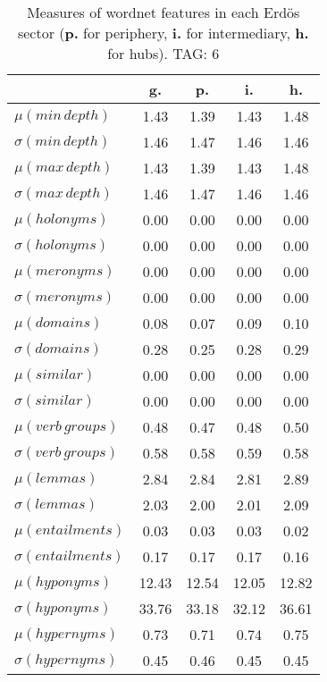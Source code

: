 \begin{table}[h!]
\begin{center}
\begin{tabular}{| l | c | c | c | c |}\hline
 & g. & p. & i. & h. \\\hline
$\mu(min\,depth)$ & 1.43  & 1.39  & 1.43  & 1.48 \\\hline
$\sigma(min\,depth)$ & 1.46  & 1.47  & 1.46  & 1.46 \\\hline
$\mu(max\,depth)$ & 1.43  & 1.39  & 1.43  & 1.48 \\\hline
$\sigma(max\,depth)$ & 1.46  & 1.47  & 1.46  & 1.46 \\\hline
$\mu(holonyms)$ & 0.00  & 0.00  & 0.00  & 0.00 \\\hline
$\sigma(holonyms)$ & 0.00  & 0.00  & 0.00  & 0.00 \\\hline
$\mu(meronyms)$ & 0.00  & 0.00  & 0.00  & 0.00 \\\hline
$\sigma(meronyms)$ & 0.00  & 0.00  & 0.00  & 0.00 \\\hline
$\mu(domains)$ & 0.08  & 0.07  & 0.09  & 0.10 \\\hline
$\sigma(domains)$ & 0.28  & 0.25  & 0.28  & 0.29 \\\hline
$\mu(similar)$ & 0.00  & 0.00  & 0.00  & 0.00 \\\hline
$\sigma(similar)$ & 0.00  & 0.00  & 0.00  & 0.00 \\\hline
$\mu(verb\,groups)$ & 0.48  & 0.47  & 0.48  & 0.50 \\\hline
$\sigma(verb\,groups)$ & 0.58  & 0.58  & 0.59  & 0.58 \\\hline
$\mu(lemmas)$ & 2.84  & 2.84  & 2.81  & 2.89 \\\hline
$\sigma(lemmas)$ & 2.03  & 2.00  & 2.01  & 2.09 \\\hline
$\mu(entailments)$ & 0.03  & 0.03  & 0.03  & 0.02 \\\hline
$\sigma(entailments)$ & 0.17  & 0.17  & 0.17  & 0.16 \\\hline
$\mu(hyponyms)$ & 12.43  & 12.54  & 12.05  & 12.82 \\\hline
$\sigma(hyponyms)$ & 33.76  & 33.18  & 32.12  & 36.61 \\\hline
$\mu(hypernyms)$ & 0.73  & 0.71  & 0.74  & 0.75 \\\hline
$\sigma(hypernyms)$ & 0.45  & 0.46  & 0.45  & 0.45 \\\hline
\end{tabular}
\caption{Measures of wordnet features in each Erd\"os sector ({{\bf p.}} for periphery, {{\bf i.}} for intermediary, {{\bf h.}} for hubs). TAG: 6}
\end{center}
\end{table}
